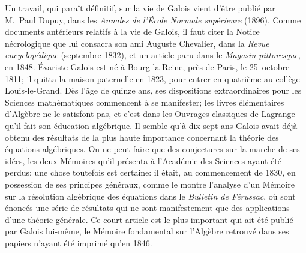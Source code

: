 \documentclass[leqno,12pt]{book}[2005/09/16]
\newcommand{\Title}[1]{\textit{#1}}
\begin{document}
Un travail, qui paraît définitif, sur la vie de Galois vient
d'être publié par M.~Paul Dupuy, dans les \Title{Annales de
l'École Normale supérieure} (1896). Comme documents
antérieurs relatifs à la vie de Galois, il faut citer la Notice
nécrologique que lui consacra son ami Auguste Chevalier,
dans la \Title{Revue encyclopédique} (septembre 1832), et un
article paru dans le \Title{Magasin pittoresque}, en 1848. Évariste
Galois est né à Bourg-la-Reine, près de Paris, le
25~octobre 1811; il quitta la maison paternelle en 1823,
pour entrer en quatrième au collège Louis-le-Grand. Dès
l'âge de quinze ans, ses dispositions extraordinaires pour les
Sciences mathématiques commencent à se manifester; les
livres élémentaires d'Algèbre ne le satisfont pas, et c'est dans
les Ouvrages classiques de Lagrange qu'il fait son éducation
algébrique. Il semble qu'à dix-sept ans Galois avait déjà
obtenu des résultats de la plus haute importance concernant
la théorie des équations algébriques. On ne peut faire que
des conjectures sur la marche de ses idées, les deux Mémoires
qu'il présenta à l'Académie des Sciences ayant été
perdus; une chose toutefois est certaine: il était, au commencement
de 1830, en possession de ses principes généraux,
comme le montre l'analyse d'un Mémoire sur la résolution
algébrique des équations dans le \Title{Bulletin de
Férussac}, où sont énoncés une série de résultats qui ne sont
manifestement que des applications d'une théorie générale.
Ce court article est le plus important qui ait été publié par
Galois lui-même, le Mémoire fondamental sur l'Algèbre retrouvé
dans ses papiers n'ayant été imprimé qu'en 1846.
\end{document}
